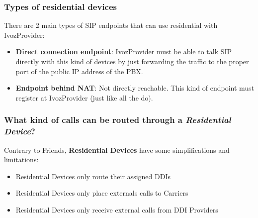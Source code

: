\documentclass[letterpaper,10pt,spanish]{sphinxmanual}
\begin{document}
\subsubsection{Types of residential devices}
\label{administration_portal/client/residential/residential_devices:types-of-residential-devices}
There are 2 main types of SIP endpoints that can use residential with IvozProvider:
\begin{itemize}
\item {} 
\textbf{Direct connection endpoint}: IvozProvider must be able to talk SIP directly with
this kind of devices by just forwarding the traffic to the proper port of
the public IP address of the PBX.

\item {} 
\textbf{Endpoint behind NAT}: Not directly reachable. This kind of endpoint must register at
IvozProvider (just like all the {\hyperref[administration_portal/client/vpbx/terminals:terminals]{}} do).

\end{itemize}


\subsubsection{What kind of calls can be routed through a \emph{Residential Device}?}
\label{administration_portal/client/residential/residential_devices:what-kind-of-calls-can-be-routed-through-a-residential-device}
Contrary to Friends, \textbf{Residential Devices} have some simplifications and limitations:
\begin{itemize}
\item {} 
Residential Devices only route their assigned DDIs

\item {} 
Residential Devices only place externals calls to Carriers

\item {} 
Residential Devices only receive external calls from DDI Providers

\end{itemize}
\end{document}
